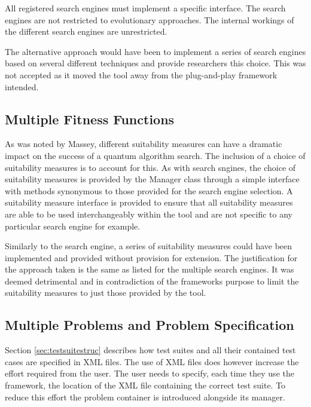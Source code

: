 All registered search engines must implement a specific interface.
The search engines are not restricted to evolutionary approaches.
The internal workings of the different search engines are unrestricted.

The alternative approach would have been to implement a series of search engines based on several different techniques and provide researchers this choice.
This was not accepted as it moved the tool away from the plug-and-play framework intended.

\subsection{Multiple Fitness Functions}
\label{sec:mulsuitmeas}
As was noted by Massey\cite{masseythesis}, different suitability measures can have a dramatic impact on the success of a quantum algorithm search.
The inclusion of a choice of suitability measures is to account for this.
As with search sngines, the choice of suitability measures is provided by the Manager class through a simple interface with methods synonymous to those provided for the search engine selection.
A suitability measure interface is provided to ensure that all suitability measures are able to be used interchangeably within the tool and are not specific to any particular search engine for example.

Similarly to the search engine, a series of suitability measures could have been implemented and provided without provision for extension.
The justification for the approach taken is the same as listed for the multiple search engines.
It was deemed detrimental and in contradiction of the frameworks purpose to limit the suitability measures to just those provided by the tool.


\subsection{Multiple Problems and Problem Specification}
\label{sec:problemman}

Section \ref{sec:testsuitestruc} describes how test suites and all their contained test cases are specified in XML files.
The use of XML files does however increase the effort required from the user.
The user needs to specify, each time they use the framework, the location of the XML file containing the correct test suite.
To reduce this effort the problem container is introduced alongside its manager.

